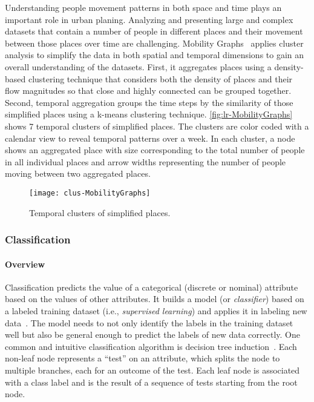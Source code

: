 Understanding people movement patterns in both space and time plays an important role in urban planing. Analyzing and presenting large and complex datasets that contain a number of people in different places and their movement between those places over time are challenging. Mobility Graphs~\cite{Landesberger2016} applies cluster analysis to simplify the data in both spatial and temporal dimensions to gain an overall understanding of the datasets. First, it aggregates places using a density-based clustering technique that considers both the density of places and their flow magnitudes so that close and highly connected can be grouped together. Second, temporal aggregation groups the time steps by the similarity of those simplified places using a k-means clustering technique. \autoref{fig:lr-MobilityGraphs} shows 7 temporal clusters of simplified places. The clusters are color coded with a calendar view to reveal temporal patterns over a week. In each cluster, a node shows an aggregated place with size corresponding to the total number of people in all individual places and arrow widths representing the number of people moving between two aggregated places.

\begin{figure}[!htb]
	\centering
	\texttt{[image: clus-MobilityGraphs]}
	\caption{Temporal clusters of simplified places. }
	\label{fig:lr-MobilityGraphs}
\end{figure}

\subsubsection{Classification}
\paragraph{Overview}
Classification predicts the value of a categorical (discrete or nominal) attribute based on the values of other attributes. It builds a model (or \emph{classifier}) based on a labeled training dataset (i.e., \emph{supervised learning}) and applies it in labeling new data~\cite{Han2011}. The model needs to not only identify the labels in the training dataset well but also be general enough to predict the labels of new data correctly. One common and intuitive classification algorithm is decision tree induction~\cite{Quinlan1986}. Each non-leaf node represents a ``test'' on an attribute, which splits the node to multiple branches, each for an outcome of the test. Each leaf node is associated with a class label and is the result of a sequence of tests starting from the root node.

